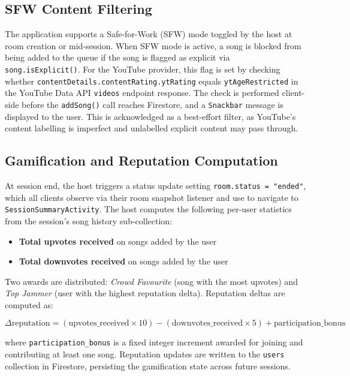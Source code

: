 \documentclass[pdflatex,sn-mathphys-num,iicol]{sn-jnl}
\theoremstyle{thmstyleone}%
\theoremstyle{thmstyletwo}%
\theoremstyle{thmstylethree}%
\begin{document}
\subsection{SFW Content Filtering}

The application supports a Safe-for-Work (SFW) mode toggled by the host at room
creation or mid-session. When SFW mode is active, a song is blocked from being added
to the queue if the song is flagged as explicit via \texttt{song.isExplicit()}. For the
YouTube provider, this flag is set by checking whether
\texttt{contentDetails.contentRating.ytRating} equals \texttt{ytAgeRestricted} in the YouTube
Data API \texttt{videos} endpoint response. The check is performed client-side before
the \texttt{addSong()} call reaches Firestore, and a \texttt{Snackbar} message is
displayed to the user. This is acknowledged as a best-effort filter, as YouTube's
content labelling is imperfect and unlabelled explicit content may pass through.

\subsection{Gamification and Reputation Computation}

At session end, the host triggers a status update setting \texttt{room.status =
"ended"}, which all clients observe via their room snapshot listener and use to
navigate to \texttt{SessionSummaryActivity}. The host computes the following per-user
statistics from the session's song history sub-collection:

\begin{itemize}
    \item \textbf{Total upvotes received} on songs added by the user
    \item \textbf{Total downvotes received} on songs added by the user
\end{itemize}

Two awards are distributed: \textit{Crowd Favourite} (song with the most upvotes)
and \textit{Top Jammer} (user with the highest reputation delta). Reputation deltas
are computed as:

\begin{equation}
\Delta\text{reputation} = (\text{upvotes\_received} \times 10) -
(\text{downvotes\_received} \times 5) + \text{participation\_bonus}
\label{eq:rep}
\end{equation}

where \texttt{participation\_bonus} is a fixed integer increment awarded for joining
and contributing at least one song. Reputation updates are written to the
\texttt{users} collection in Firestore, persisting the gamification state across
future sessions.
\end{document}
